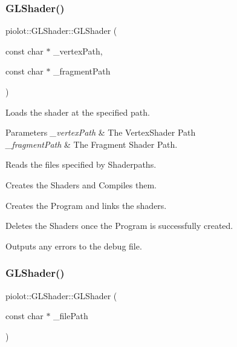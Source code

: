 \subsubsection{\texorpdfstring{G\+L\+Shader()}{GLShader()}\hspace{0.1cm}{\footnotesize\ttfamily [1/2]}}
{\footnotesize\ttfamily piolot\+::\+G\+L\+Shader\+::\+G\+L\+Shader (\begin{DoxyParamCaption}\item[{const char $\ast$}]{\+\_\+vertex\+Path,  }\item[{const char $\ast$}]{\+\_\+fragment\+Path }\end{DoxyParamCaption})}



Loads the shader at the specified path. 


\begin{DoxyParams}{Parameters}
{\em \+\_\+vertex\+Path} & The Vertex\+Shader Path \\
\hline
{\em \+\_\+fragment\+Path} & The Fragment Shader Path.\\
\hline
\end{DoxyParams}

\begin{DoxyItemize}
\item Reads the files specified by Shaderpaths.
\item Creates the Shaders and Compiles them.
\item Creates the Program and links the shaders.
\item Deletes the Shaders once the Program is successfully created.
\item Outputs any errors to the debug file. 
\end{DoxyItemize}\mbox{\label{classpiolot_1_1_g_l_shader_a1ed833e8b2ade593d5c820981121bfbb}} 
\subsubsection{\texorpdfstring{G\+L\+Shader()}{GLShader()}\hspace{0.1cm}{\footnotesize\ttfamily [2/2]}}
{\footnotesize\ttfamily piolot\+::\+G\+L\+Shader\+::\+G\+L\+Shader (\begin{DoxyParamCaption}\item[{const char $\ast$}]{\+\_\+file\+Path }\end{DoxyParamCaption})\hspace{0.3cm}{\ttfamily [explicit]}}

